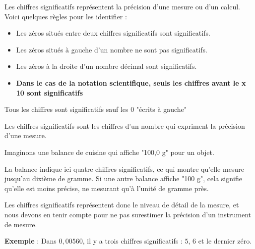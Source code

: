 \documentclass[a4paper,12pt]{article}
\begin{document}
Les chiffres significatifs représentent la précision d'une mesure ou d'un calcul. Voici quelques règles pour les identifier :
\begin{itemize}[noitemsep]
    \item Les zéros situés entre deux chiffres significatifs sont significatifs.
    \item Les zéros situés à gauche d’un nombre ne sont pas significatifs.
    \item Les zéros à la droite d'un nombre décimal sont significatifs.
    \item \textbf{Dans le cas de la notation scientifique, seuls les chiffres avant le x 10 sont significatifs}
\end{itemize}

\begin{tcolorbox}[colback=gray!10!white, colframe=gray!75!black, title=Autrement dit]
  Tous les chiffres sont significatifs sauf les 0 "écrits à gauche"
\end{tcolorbox}

\begin{tcolorbox}[colback=green!10!white, colframe=green!75!black, title=Interprétation]
  Les chiffres significatifs sont les chiffres d'un nombre qui expriment la précision d'une mesure. \\

  \vspace{1em}

  Imaginons une balance de cuisine qui affiche "100,0 g" pour un objet. \\

  \vspace{1em}

  La balance indique ici quatre chiffres significatifs, ce qui montre qu'elle mesure jusqu'au dixième de gramme.
  Si une autre balance affiche "100 g", cela signifie qu'elle est moins précise, ne mesurant qu'à l'unité de gramme près.
  
  \vspace{1em}

  Les chiffres significatifs représentent donc le niveau de détail de la mesure, et nous devons en tenir compte pour ne pas surestimer la précision d'un instrument de mesure.

\end{tcolorbox}

\textbf{Exemple} : Dans \( 0,00560 \), il y a trois chiffres significatifs : \( 5 \), \( 6 \) et le dernier zéro.

\vspace{1em}
\end{document}
